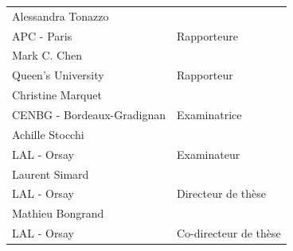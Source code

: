 \documentclass[a4paper]{article}
\newcommand{\jurynameA}{Achille Stocchi}
\newcommand{\juryadressA}{LAL - Orsay}
\newcommand{\juryroleA}{Examinateur}
\newcommand{\jurynameB}{Alessandra Tonazzo}
\newcommand{\juryadressB}{APC - Paris}
\newcommand{\juryroleB}{Rapporteure}
\newcommand{\jurynameD}{Mark C. Chen}
\newcommand{\juryadressD}{Queen's University}
\newcommand{\juryroleD}{Rapporteur}
\newcommand{\jurynameE}{Christine Marquet}
\newcommand{\juryadressE}{CENBG - Bordeaux-Gradignan}
\newcommand{\juryroleE}{Examinatrice}
\newcommand{\jurynameH}{Laurent Simard}
\newcommand{\juryadressH}{LAL - Orsay}
\newcommand{\juryroleH}{Directeur de thèse}
\newcommand{\jurynameI}{Mathieu Bongrand}
\newcommand{\juryadressI}{LAL - Orsay}
\newcommand{\juryroleI}{Co-directeur de thèse}
\begin{document}
\begin{textblock}{12}
	\label{jury} 																				%
        \begin{center}
	\begin{tabular}{@{} L{8.5cm} R{2.5cm}}
		\jurynameB  \\ \juryadressB & \juryroleB \\[7pt]
		\jurynameD  \\ \juryadressD & \juryroleD \\[7pt]
		\jurynameE  \\ \juryadressE & \juryroleE \\[7pt]
                \jurynameA  \\ \juryadressA & \juryroleA \\[7pt]
		\jurynameH  \\ \juryadressH & \juryroleH \\[7pt]
		\jurynameI  \\ \juryadressI & \juryroleI \\[7pt]

	\end{tabular}
	\end{center}
\end{textblock}
\end{document}
